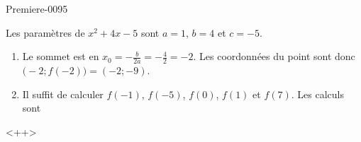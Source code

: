 
\begin{corrige}{Premiere-0095}

    Les paramètres de \( x^2+4x-5\) sont \( a=1\), \( b=4\) et \( c=-5\).
    \begin{enumerate}
        \item
            Le sommet est en \( x_0=-\frac{ b }{ 2a }=-\frac{ 4 }{ 2 }=-2\). Les coordonnées du point sont donc \( \big( -2;f(-2) \big)=(-2;-9)\).
        \item
            Il suffit de calculer \( f(-1)\), \( f(-5)\), \( f(0)\), \( f(1)\) et \( f(7)\). Les calculs sont
    \end{enumerate}
    <++>

\end{corrige}
